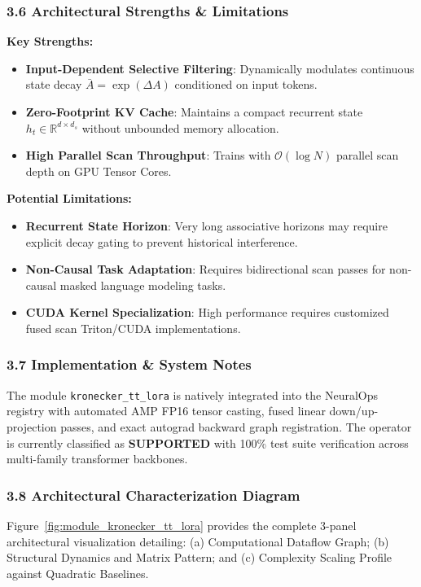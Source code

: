 \subsubsection*{3.6 Architectural Strengths \& Limitations}
\textbf{Key Strengths:}
\begin{itemize}
    \item \textbf{Input-Dependent Selective Filtering}: Dynamically modulates continuous state decay $\bar{A} = \exp(\Delta A)$ conditioned on input tokens.
    \item \textbf{Zero-Footprint KV Cache}: Maintains a compact recurrent state $h_t \in \mathbb{R}^{d \times d_s}$ without unbounded memory allocation.
    \item \textbf{High Parallel Scan Throughput}: Trains with $\mathcal{O}(\log N)$ parallel scan depth on GPU Tensor Cores.
\end{itemize}

\textbf{Potential Limitations:}
\begin{itemize}
    \item \textbf{Recurrent State Horizon}: Very long associative horizons may require explicit decay gating to prevent historical interference.
    \item \textbf{Non-Causal Task Adaptation}: Requires bidirectional scan passes for non-causal masked language modeling tasks.
    \item \textbf{CUDA Kernel Specialization}: High performance requires customized fused scan Triton/CUDA implementations.
\end{itemize}

\subsubsection*{3.7 Implementation \& System Notes}
The module \texttt{kronecker\_tt\_lora} is natively integrated into the NeuralOps registry with automated AMP FP16 tensor casting, fused linear down/up-projection passes, and exact autograd backward graph registration. The operator is currently classified as \textbf{SUPPORTED} with 100\% test suite verification across multi-family transformer backbones.

\subsubsection*{3.8 Architectural Characterization Diagram}
Figure~\ref{fig:module_kronecker_tt_lora} provides the complete 3-panel architectural visualization detailing: (a) Computational Dataflow Graph; (b) Structural Dynamics and Matrix Pattern; and (c) Complexity Scaling Profile against Quadratic Baselines.

